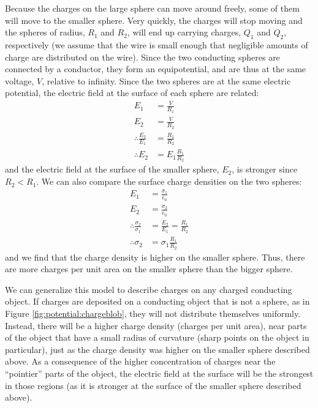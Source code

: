 Because the charges on the large sphere can move around freely, some of them will move to the smaller sphere. Very quickly, the charges will stop moving and the spheres of radius, $R_1$ and $R_2$, will end up carrying charges, $Q_1$ and $Q_2$, respectively (we assume that the wire is small enough that negligible amounts of charge are distributed on the wire). Since the two conducting spheres are connected by a conductor, they form an equipotential, and are thus at the same voltage, $V$, relative to infinity. Since the two spheres are at the same electric potential, the electric field at the surface of each sphere are related:
\begin{align*}
E_1&=\frac{V}{R_1}\\
E_2&=\frac{V}{R_2}\\
\therefore \frac{E_2}{E_1}&=\frac{R_1}{R_2}\\
\therefore E_2&=E_1\frac{R_1}{R_2}
\end{align*}
and the electric field at the surface of the smaller sphere, $E_2$, is stronger since $R_2<R_1$. We can also compare the surface charge densities on the two spheres:
\begin{align*}
E_1&=\frac{\sigma_1}{\epsilon_0}\\
E_2&=\frac{\sigma_2}{\epsilon_0}\\
\therefore \frac{\sigma_2}{\sigma_1}&=\frac{E_2}{E_1}=\frac{R_1}{R_2}\\
\therefore \sigma_2&=\sigma_1 \frac{R_1}{R_2}
\end{align*}
and we find that the charge density is higher on the smaller sphere. Thus, there are more charges per unit area on the smaller sphere than the bigger sphere.

We can generalize this model to describe charges on any charged conducting object. If charges are deposited on a conducting object that is not a sphere, as in Figure \ref{fig:potential:chargeblob}, they will not distribute themselves uniformly. Instead, there will be a higher charge density (charges per unit area), near parts of the object that have a small radius of curvature (sharp points on the object in particular), just as the charge density was higher on the smaller sphere described above. As a consequence of the higher concentration of charges near the ``pointier'' parts of the object, the electric field at the surface will be the strongest in those regions (as it is stronger at the surface of the smaller sphere described above).


